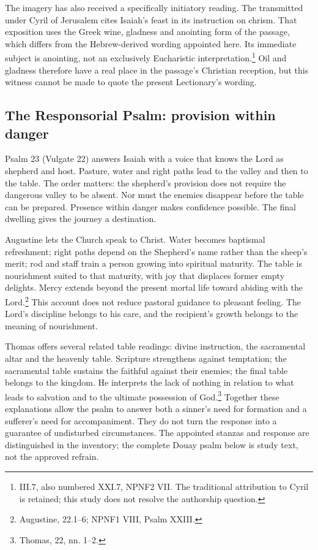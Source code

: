 The imagery has also received a specifically initiatory reading. The  transmitted under Cyril of Jerusalem cites Isaiah's feast in its instruction on chrism. That exposition uses the Greek wine, gladness and anointing form of the passage, which differs from the Hebrew-derived wording appointed here. Its immediate subject is anointing, not an exclusively Eucharistic interpretation.\footnote{ III.7, also numbered  XXI.7, NPNF2 VII. The traditional attribution to Cyril is retained; this study does not resolve the authorship question.} Oil and gladness therefore have a real place in the passage's Christian reception, but this witness cannot be made to quote the present Lectionary's wording.

\subsection{The Responsorial Psalm: provision within danger}
Psalm 23 (Vulgate 22) answers Isaiah with a voice that knows the Lord as shepherd and host. Pasture, water and right paths lead to the valley and then to the table. The order matters: the shepherd's provision does not require the dangerous valley to be absent. Nor must the enemies disappear before the table can be prepared. Presence within danger makes confidence possible. The final dwelling gives the journey a destination.

Augustine lets the Church speak to Christ. Water becomes baptismal refreshment; right paths depend on the Shepherd's name rather than the sheep's merit; rod and staff train a person growing into spiritual maturity. The table is nourishment suited to that maturity, with joy that displaces former empty delights. Mercy extends beyond the present mortal life toward abiding with the Lord.\footnote{Augustine,  22.1--6; NPNF1 VIII, Psalm XXIII.} This account does not reduce pastoral guidance to pleasant feeling. The Lord's discipline belongs to his care, and the recipient's growth belongs to the meaning of nourishment.

Thomas offers several related table readings: divine instruction, the sacramental altar and the heavenly table. Scripture strengthens against temptation; the sacramental table sustains the faithful against their enemies; the final table belongs to the kingdom. He interprets the lack of nothing in relation to what leads to salvation and to the ultimate possession of God.\footnote{Thomas,  22, nn. 1--2.} Together these explanations allow the psalm to answer both a sinner's need for formation and a sufferer's need for accompaniment. They do not turn the response into a guarantee of undisturbed circumstances. The appointed stanzas and response are distinguished in the inventory; the complete Douay psalm below is study text, not the approved refrain.

